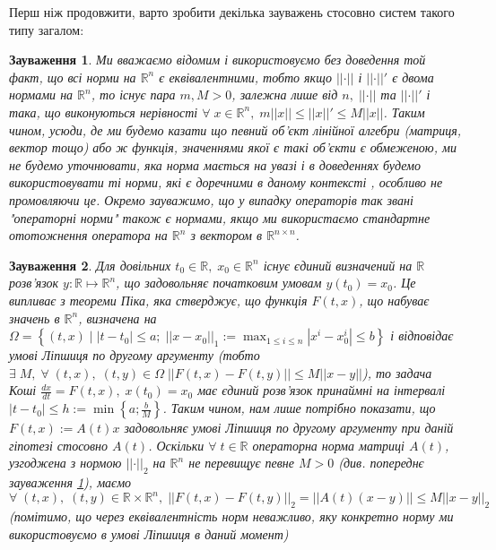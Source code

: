 \documentclass[14pt]{extarticle} %
\let\oldmin\min
\renewcommand{\min}{\displaystyle\oldmin}
\let\oldmax\max
\renewcommand{\max}{\displaystyle\oldmax}
\let\oldforall\forall
\renewcommand{\forall}{\oldforall\;}
\let\oldexists\exists
\renewcommand{\exists}{\oldexists\;}
\newcommand{\mynorm}[1]{\left|\left|#1\right|\right|}
\newcommand{\myabs}[1]{\left|#1\right|}
\newtheorem{remark}{Зауваження}
\begin{document}
Перш ніж продовжити, варто зробити декілька зауважень стосовно систем такого типу загалом:
\begin{remark}\label{AllNormsAreEqRemark}
	Ми вважаємо відомим і використовуємо без доведення той факт, що всі норми на $\mathbb{R}^n$ є еквівалентними,
	тобто якщо $\mynorm{\cdot}$ і $\mynorm{\cdot}'$ є двома нормами на $\mathbb{R}^n$, то існує пара $m,M>0$, залежна
	лише від $n,\;\mynorm{\cdot}$ та $\mynorm{\cdot}'$ і така, що виконуються нерівності $\forall x\in\mathbb{R}^n,\;m\mynorm{x}\leq
	\mynorm{x}'\leq M\mynorm{x}$. Таким чином, усюди, де ми будемо казати що певний об’єкт лінійної алгебри (матриця, вектор тощо) або ж
	функція, значеннями якої є такі об’єкти є обмеженою, ми не будемо уточнювати, яка норма мається на увазі і в доведеннях будемо 
	використовувати ті норми, які є доречними в даному контексті
	, особливо не промовляючи це. Окремо зауважимо, що у випадку операторів так звані "операторні норми" також
	є нормами, якщо ми використаємо стандартне ототожнення оператора на $\mathbb{R}^n$ з вектором в $\mathbb{R}^{n\times n}$.
\end{remark}
\begin{remark}\label{SolsExistAndUniqRemark}
	Для довільних $t_0\in\mathbb{R},\;x_0\in\mathbb{R}^n$ існує єдиний визначений на 
$\mathbb{R}$ розв'язок $y:\mathbb{R}\mapsto\mathbb{R}^n$, що задовольняє початковим умовам $y(t_0)=x_0$.
Це випливає з теореми Піка, яка стверджує, що функція $F(t,x)$, що набуває значень в $\mathbb{R}^n$, визначена на 
$\Omega=\left\{(t,x) \mid \myabs{t-t_0}\leq a;\;\mynorm{x-x_0}_1:=\max_{1\leq i\leq n}\myabs{x^i-x^i_0}\leq b\right\}$ і відповідає умові Ліпшиця по другому аргументу (тобто 
$\exists M,\;\forall (t,x),\;(t,y)\in\Omega\;\mynorm{F(t,x)-F(t,y)}\leq M\mynorm{x-y}$), то задача Коші $\frac{dx}{dt}=F(t,x),\;x(t_0)=x_0$
має єдиний розв’язок принаймні на інтервалі $\myabs{t-t_0}\leq h:=\min\left\{a;\frac{b}{M}\right\}$. Таким чином, нам лише потрібно показати,
що $F(t,x):=A(t)x$ задовольняє умові Ліпшиця по другому аргументу при даній гіпотезі стосовно $A(t)$. Оскільки $\forall t\in\mathbb{R}$
операторна норма матриці $A(t)$, узгоджена з нормою $\mynorm{\cdot}_2$ на $\mathbb{R}^n$ не перевищує певне $M>0$
(див. попереднє зауваження \ref{AllNormsAreEqRemark}), маємо 
$\forall (t,x),\;(t,y)\in\mathbb{R}\times\mathbb{R}^n,\;\mynorm{F(t,x)-F(t,y)}_2=\mynorm{A(t)(x-y)}\leq M\mynorm{x-y}_2$ (помітимо,
що через еквівалентність норм неважливо, яку конкретно норму ми використовуємо в умові Ліпшиця в даний момент)
\end{remark}
\end{document}
